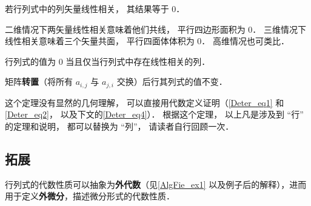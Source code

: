 \begin{theorem}{ }
若行列式中的列矢量线性相关， 其结果等于 0．
\end{theorem}
二维情况下两矢量线性相关意味着他们共线， 平行四边形面积为 0． 三维情况下线性相关意味着三个矢量共面， 平行四面体体积为 0． 高维情况也可类比．

\begin{theorem}{ } \label{DetPro_the2}
行列式的值为 0 当且仅当行列式中存在线性相关的列．
\end{theorem}

\begin{theorem}{ }
矩阵\textbf{转置}（将所有 $a_{i,j}$ 与 $a_{j,i}$ 交换）后行其列式的值不变．
\end{theorem}
这个定理没有显然的几何理解， 可以直接用代数定义证明（\autoref{Deter_eq1} 和\autoref{Deter_eq2}， 以及下文的\autoref{Deter_eq4}）． 根据这个定理， 以上凡是涉及到 “行” 的定理和说明， 都可以替换为 “列”， 请读者自行回顾一次．

\subsection{拓展}

行列式的代数性质可以抽象为\textbf{外代数}（见\autoref{AlgFie_ex1} 以及例子后的解释），进而用于定义\textbf{外微分}，描述微分形式的代数性质．
